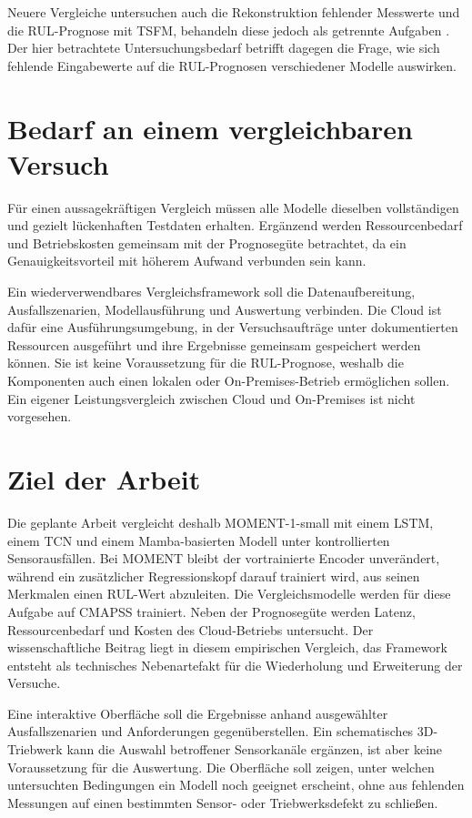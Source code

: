 Neuere Vergleiche untersuchen auch die Rekonstruktion fehlender Messwerte und die \ac{RUL}-Prognose mit \ac{TSFM}, behandeln diese jedoch als getrennte Aufgaben \parencite[Abschn.~3.2.1 und 3.2.4]{maBenchmarkingTimeSeries2026}. Der hier betrachtete Untersuchungsbedarf betrifft dagegen die Frage, wie sich fehlende Eingabewerte auf die \ac{RUL}-Prognosen verschiedener Modelle auswirken.

\section{Bedarf an einem vergleichbaren Versuch}

Für einen aussagekräftigen Vergleich müssen alle Modelle dieselben vollständigen und gezielt lückenhaften Testdaten erhalten. Ergänzend werden Ressourcenbedarf und Betriebskosten gemeinsam mit der Prognosegüte betrachtet, da ein Genauigkeitsvorteil mit höherem Aufwand verbunden sein kann.

Ein wiederverwendbares Vergleichsframework soll die Datenaufbereitung, Ausfallszenarien, Modellausführung und Auswertung verbinden. Die Cloud ist dafür eine Ausführungsumgebung, in der Versuchsaufträge unter dokumentierten Ressourcen ausgeführt und ihre Ergebnisse gemeinsam gespeichert werden können. Sie ist keine Voraussetzung für die \ac{RUL}-Prognose, weshalb die Komponenten auch einen lokalen oder On-Premises-Betrieb ermöglichen sollen. Ein eigener Leistungsvergleich zwischen Cloud und On-Premises ist nicht vorgesehen.

\section{Ziel der Arbeit}

Die geplante Arbeit vergleicht deshalb MOMENT-1-small mit einem \ac{LSTM}, einem \ac{TCN} und einem Mamba-basierten Modell unter kontrollierten Sensorausfällen. Bei MOMENT bleibt der vortrainierte Encoder unverändert, während ein zusätzlicher Regressionskopf darauf trainiert wird, aus seinen Merkmalen einen \ac{RUL}-Wert abzuleiten. Die Vergleichsmodelle werden für diese Aufgabe auf \ac{CMAPSS} trainiert. Neben der Prognosegüte werden Latenz, Ressourcenbedarf und Kosten des Cloud-Betriebs untersucht. Der wissenschaftliche Beitrag liegt in diesem empirischen Vergleich, das Framework entsteht als technisches Nebenartefakt für die Wiederholung und Erweiterung der Versuche.

Eine interaktive Oberfläche soll die Ergebnisse anhand ausgewählter Ausfallszenarien und Anforderungen gegenüberstellen. Ein schematisches 3D-Triebwerk kann die Auswahl betroffener Sensorkanäle ergänzen, ist aber keine Voraussetzung für die Auswertung. Die Oberfläche soll zeigen, unter welchen untersuchten Bedingungen ein Modell noch geeignet erscheint, ohne aus fehlenden Messungen auf einen bestimmten Sensor- oder Triebwerksdefekt zu schließen.
